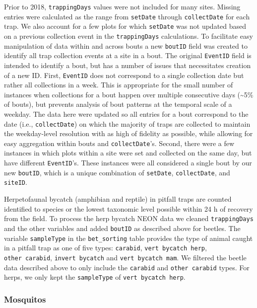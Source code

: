 \documentclass[
  12pt,
]{article}
\begin{document}
Prior to 2018, \texttt{trappingDays} values were not included for many sites. Missing entries were calculated as the range from \texttt{setDate} through \texttt{collectDate} for each trap. We also account for a few plots for which \texttt{setDate} was not updated based on a previous collection event in the \texttt{trappingDays} calculations. To facilitate easy manipulation of data within and across bouts a new \texttt{boutID} field was created to identify all trap collection events at a site in a bout. The original \texttt{EventID} field is intended to identify a bout, but has a number of issues that necessitates creation of a new ID. First, \texttt{EventID} does not correspond to a single collection date but rather all collections in a week. This is appropriate for the small number of instances when collections for a bout happen over multiple consecutive days (\textasciitilde5\% of bouts), but prevents analysis of bout patterns at the temporal scale of a weekday. The data here were updated so all entries for a bout correspond to the date (i.e., \texttt{collectDate}) on which the majority of traps are collected to maintain the weekday-level resolution with as high of fidelity as possible, while allowing for easy aggregation within bouts and \texttt{collectDate}'s. Second, there were a few instances in which plots within a site were set and collected on the same day, but have different \texttt{EventID}'s. These instances were all considered a single bout by our new \texttt{boutID}, which is a unique combination of \texttt{setDate}, \texttt{collectDate}, and \texttt{siteID}.

Herpetofaunal bycatch (amphibian and reptile) in pitfall traps are counted identified to species or the lowest taxonomic level possible within 24 h of recovery from the field. To process the herp bycatch NEON data we cleaned \texttt{trappingDays} and the other variables and added \texttt{boutID} as described above for beetles. The variable \texttt{sampleType} in the \texttt{bet\_sorting} table provides the type of animal caught in a pitfall trap as one of five types: \texttt{carabid}, \texttt{vert\ bycatch\ herp}, \texttt{other\ carabid}, \texttt{invert\ bycatch} and \texttt{vert\ bycatch\ mam}. We filtered the beetle data described above to only include the \texttt{carabid} and \texttt{other\ carabid} types. For herps, we only kept the \texttt{sampleType} of \texttt{vert\ bycatch\ herp}.

\hypertarget{mosquitos}{%
\subsubsection{Mosquitos}\label{mosquitos}}
\end{document}
